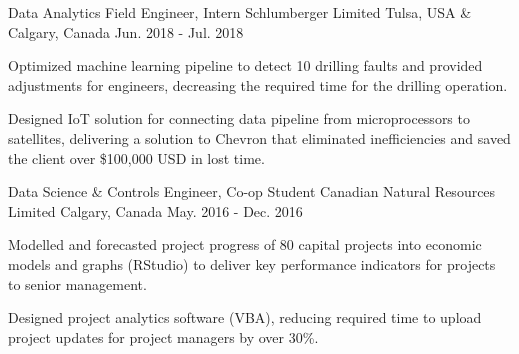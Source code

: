 \begin{cventries}
  \cventry
    {Data Analytics Field Engineer, Intern} %
    {Schlumberger Limited} %
    {Tulsa, USA \& Calgary, Canada} %
    {Jun. 2018 - Jul. 2018} %
    {
      \begin{cvitems} %
        \item {Optimized machine learning pipeline to detect 10 drilling faults and provided adjustments for engineers, decreasing the required time for the drilling operation.}
        \item {Designed IoT solution for connecting data pipeline from microprocessors to satellites, delivering a solution to Chevron that eliminated inefficiencies and saved the client over \$100,000 USD in lost time.}
      \end{cvitems}
    }

  \cventry
    {Data Science \& Controls Engineer, Co-op Student} %
    {Canadian Natural Resources Limited} %
    {Calgary, Canada} %
    {May. 2016 - Dec. 2016} %
    {
      \begin{cvitems} %
        \item {Modelled and forecasted project progress of 80 capital projects into economic models and graphs (RStudio) to deliver key performance indicators for projects to senior management.}
        \item {Designed project analytics software (VBA), reducing required time to upload project updates for project managers by over 30\%.}
      \end{cvitems}
    }



\end{cventries}
